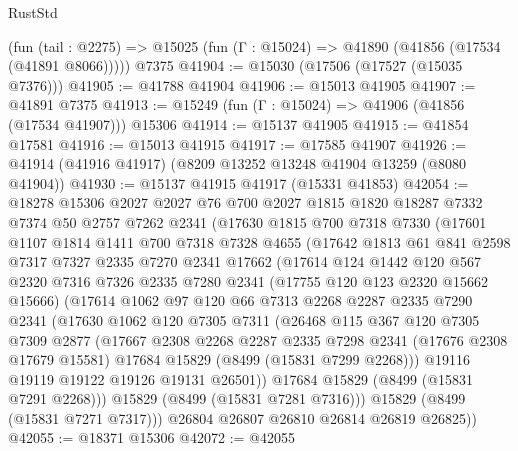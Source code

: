 \begin{lexlean}{RustStd}
\begin{coremodule}
    (fun (tail : @2275) => @15025 (fun (Γ : @15024) => @41890 (@41856 (@17534 (@41891 @8066)))))
    @7375
@41904 := @15030 (@17506 (@17527 (@15035 @7376)))
@41905 := @41788 @41904
@41906 := @15013 @41905
@41907 := @41891 @7375
@41913 := @15249 (fun (Γ : @15024) => @41906 (@41856 (@17534 @41907))) @15306
@41914 := @15137 @41905
@41915 := @41854 @17581
@41916 := @15013 @41915
@41917 := @17585 @41907
@41926 := @41914 (@41916 @41917) (@8209 @13252 @13248 @41904 @13259 (@8080 @41904))
@41930 := @15137 @41915 @41917 (@15331 @41853)
@42054 := @18278
    @15306
    @2027
    @2027
    @76
    @700
    @2027
    @1815
    @1820
    @18287
    @7332
    @7374
    @50
    @2757
    @7262
    @2341
    (@17630
      @1815
      @700
      @7318
      @7330
      (@17601
        @1107
        @1814
        @1411
        @700
        @7318
        @7328
        @4655
        (@17642
          @1813
          @61
          @841
          @2598
          @7317
          @7327
          @2335
          @7270
          @2341
          @17662
          (@17614
            @124
            @1442
            @120
            @567
            @2320
            @7316
            @7326
            @2335
            @7280
            @2341
            (@17755 @120 @123 @2320 @15662 @15666)
            (@17614
              @1062
              @97
              @120
              @66
              @7313
              @2268
              @2287
              @2335
              @7290
              @2341
              (@17630
                @1062
                @120
                @7305
                @7311
                (@26468
                  @115
                  @367
                  @120
                  @7305
                  @7309
                  @2877
                  (@17667
                    @2308
                    @2268
                    @2287
                    @2335
                    @7298
                    @2341
                    (@17676 @2308 @17679 @15581)
                    @17684
                    @15829
                    (@8499 (@15831 @7299 @2268)))
                  @19116
                  @19119
                  @19122
                  @19126
                  @19131
                  @26501))
              @17684
              @15829
              (@8499 (@15831 @7291 @2268)))
            @15829
            (@8499 (@15831 @7281 @7316)))
          @15829
          (@8499 (@15831 @7271 @7317)))
        @26804
        @26807
        @26810
        @26814
        @26819
        @26825))
@42055 := @18371 @15306
@42072 := @42055

\end{coremodule}
\end{lexlean}
